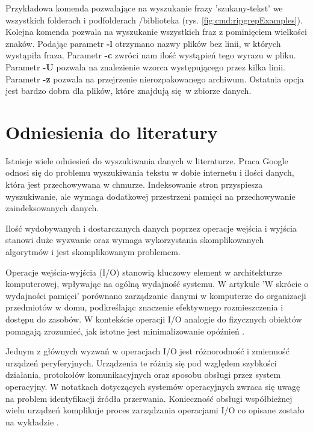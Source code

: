 Przykładowa komenda pozwalające na wyszukanie frazy 'szukany-tekst' we wszystkich
folderach i podfolderach /biblioteka (rys. \ref{fig:cmd:ripgrepExamples}). Kolejna
komenda pozwala na wyszukanie wszystkich fraz z pominięciem wielkości znaków. 
Podając parametr \textbf{-l} otrzymano nazwy plików bez linii, w których 
wystąpiła fraza. Parametr \textbf{-c} zwróci nam ilość wystąpień tego wyrazu w 
pliku. Parametr \textbf{-U} pozwala na znalezienie wzorca występującego przez 
kilka linii. Parametr \textbf{-z} pozwala na przejrzenie nierozpakowanego 
archiwum. Ostatnia opcja jest bardzo dobra dla plików, które znajdują się w 
zbiorze danych.

\section{Odniesienia do literatury}

Istnieje wiele odniesień do wyszukiwania danych w literaturze. Praca Google 
\cite{bib:internet:htmlSearchGoogle} odnosi się do problemu wyszukiwania tekstu 
w dobie internetu i ilości danych, która jest przechowywana w chmurze. 
Indeksowanie stron przyspiesza wyszukiwanie, ale wymaga dodatkowej przestrzeni
pamięci na przechowywanie zaindeksowanych danych.

Ilość wydobywanych i dostarczanych danych poprzez operacje wejścia i wyjścia stanowi duże wyzwanie
oraz wymaga wykorzystania skomplikowanych algorytmów i jest skomplikowanym
problemem. 

Operacje wejścia-wyjścia (I/O) stanowią kluczowy element w architekturze 
komputerowej, wpływając na ogólną wydajność systemu. W artykule 'W skrócie o 
wydajności pamięci' porównano zarządzanie danymi w komputerze do 
organizacji przedmiotów w domu, podkreślając znaczenie efektywnego 
rozmieszczenia i dostępu do zasobów. W kontekście operacji I/O analogie do 
fizycznych obiektów pomagają zrozumieć, jak istotne jest minimalizowanie 
opóźnień \cite{bib:internet:IntelMemoryPerformance}. 

Jednym z głównych wyzwań w operacjach I/O jest różnorodność i zmienność 
urządzeń peryferyjnych. Urządzenia te różnią się pod względem szybkości 
działania, protokołów komunikacyjnych oraz sposobu obsługi przez system 
operacyjny. W notatkach dotyczących systemów operacyjnych zwraca się uwagę na 
problem identyfikacji źródła przerwania. Konieczność obsługi współbieżnej 
wielu urządzeń komplikuje proces zarządzania operacjami I/O co opisane
zostało na wykładzie \cite{bib:internet:UrzadzeniaWejsciaWyjscia}. 

